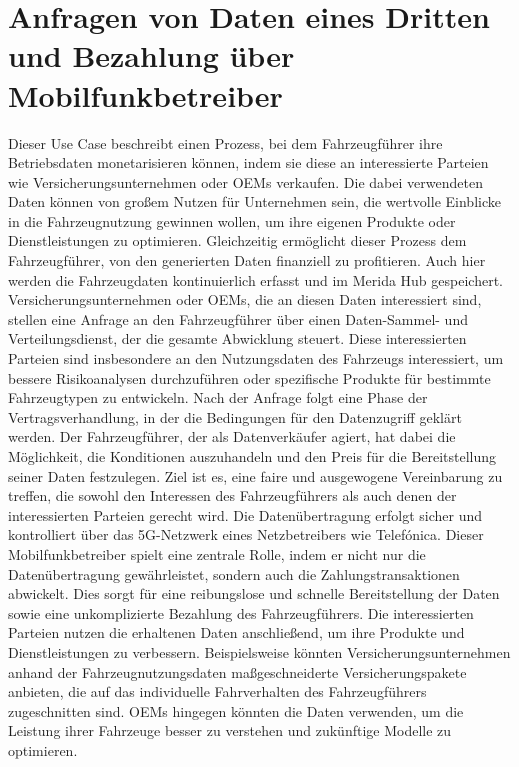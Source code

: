\section{Anfragen von Daten eines Dritten und Bezahlung über Mobilfunkbetreiber}
Dieser Use Case beschreibt einen Prozess, bei dem Fahrzeugführer ihre Betriebsdaten monetarisieren können, indem sie diese an interessierte Parteien wie Versicherungsunternehmen oder OEMs verkaufen. Die dabei verwendeten Daten können von großem Nutzen für Unternehmen sein, die wertvolle Einblicke in die Fahrzeugnutzung gewinnen wollen, um ihre eigenen Produkte oder Dienstleistungen zu optimieren. Gleichzeitig ermöglicht dieser Prozess dem Fahrzeugführer, von den generierten Daten finanziell zu profitieren.
\newline
Auch hier werden die Fahrzeugdaten kontinuierlich erfasst und im Merida Hub gespeichert. Versicherungsunternehmen oder OEMs, die an diesen Daten interessiert sind, stellen eine Anfrage an den Fahrzeugführer über einen Daten-Sammel- und Verteilungsdienst, der die gesamte Abwicklung steuert. Diese interessierten Parteien sind insbesondere an den Nutzungsdaten des Fahrzeugs interessiert, um bessere Risikoanalysen durchzuführen oder spezifische Produkte für bestimmte Fahrzeugtypen zu entwickeln.
\newline
\newline
Nach der Anfrage folgt eine Phase der Vertragsverhandlung, in der die Bedingungen für den Datenzugriff geklärt werden. Der Fahrzeugführer, der als Datenverkäufer agiert, hat dabei die Möglichkeit, die Konditionen auszuhandeln und den Preis für die Bereitstellung seiner Daten festzulegen. Ziel ist es, eine faire und ausgewogene Vereinbarung zu treffen, die sowohl den Interessen des Fahrzeugführers als auch denen der interessierten Parteien gerecht wird.
\newline
Die Datenübertragung erfolgt sicher und kontrolliert über das 5G-Netzwerk eines Netzbetreibers wie Telefónica. Dieser Mobilfunkbetreiber spielt eine zentrale Rolle, indem er nicht nur die Datenübertragung gewährleistet, sondern auch die Zahlungstransaktionen abwickelt. Dies sorgt für eine reibungslose und schnelle Bereitstellung der Daten sowie eine unkomplizierte Bezahlung des Fahrzeugführers.
\newline
Die interessierten Parteien nutzen die erhaltenen Daten anschließend, um ihre Produkte und Dienstleistungen zu verbessern. Beispielsweise könnten Versicherungsunternehmen anhand der Fahrzeugnutzungsdaten maßgeschneiderte Versicherungspakete anbieten, die auf das individuelle Fahrverhalten des Fahrzeugführers zugeschnitten sind. OEMs hingegen könnten die Daten verwenden, um die Leistung ihrer Fahrzeuge besser zu verstehen und zukünftige Modelle zu optimieren.
